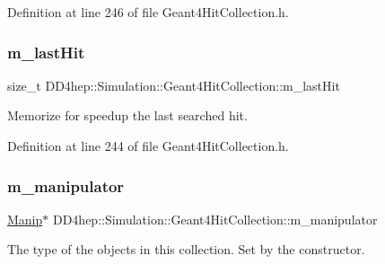 Definition at line 246 of file Geant4\+Hit\+Collection.\+h.

\hypertarget{class_d_d4hep_1_1_simulation_1_1_geant4_hit_collection_a67cef40b22ad50d9c6a5fdd620e1786f}{}\label{class_d_d4hep_1_1_simulation_1_1_geant4_hit_collection_a67cef40b22ad50d9c6a5fdd620e1786f} 
\subsubsection{\texorpdfstring{m\+\_\+last\+Hit}{m\_lastHit}}
{\footnotesize\ttfamily size\+\_\+t D\+D4hep\+::\+Simulation\+::\+Geant4\+Hit\+Collection\+::m\+\_\+last\+Hit\hspace{0.3cm}{\ttfamily [protected]}}



Memorize for speedup the last searched hit. 



Definition at line 244 of file Geant4\+Hit\+Collection.\+h.

\hypertarget{class_d_d4hep_1_1_simulation_1_1_geant4_hit_collection_ab65b438cada304dbfe15f9be6a329001}{}\label{class_d_d4hep_1_1_simulation_1_1_geant4_hit_collection_ab65b438cada304dbfe15f9be6a329001} 
\subsubsection{\texorpdfstring{m\+\_\+manipulator}{m\_manipulator}}
{\footnotesize\ttfamily \hyperlink{class_d_d4hep_1_1_simulation_1_1_geant4_hit_collection_a7a4b540fa0c4983ebd755a049a2794b7}{Manip}$\ast$ D\+D4hep\+::\+Simulation\+::\+Geant4\+Hit\+Collection\+::m\+\_\+manipulator\hspace{0.3cm}{\ttfamily [protected]}}



The type of the objects in this collection. Set by the constructor. 



